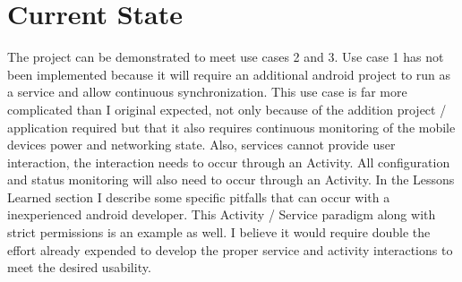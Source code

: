 \documentclass[12pt]{article}
\begin{document}
\section{Current State}
The project can be demonstrated to meet use cases 2 and 3.  Use case 1 has not been implemented because it will require an additional android project to run as a service and allow continuous synchronization.  This use case is far more complicated than I original expected, not only because of the addition project / application required but that it also requires continuous monitoring of the mobile devices power and networking state. Also, services cannot provide user interaction, the interaction needs to occur through an Activity. All configuration and status monitoring will also need to occur through an Activity.  In the Lessons Learned section I describe some specific pitfalls that can occur with a inexperienced android developer. This Activity / Service paradigm along with strict permissions is an example as well. I believe it would require double the effort already expended to develop the proper service and activity interactions to meet the desired usability.
\end{document}
